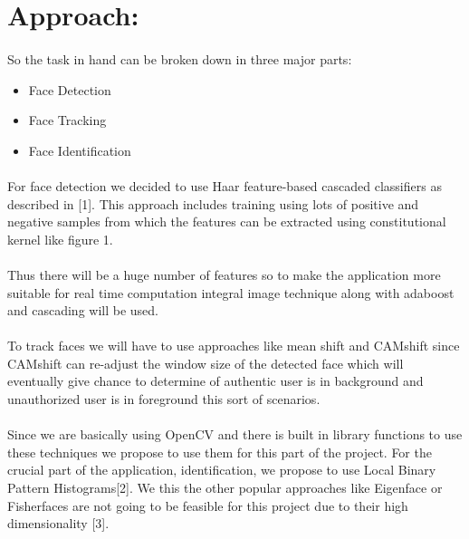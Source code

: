\documentclass[11pt]{article}
\begin{document}
\section*{Approach:}
\paragraph*{} So the task in hand can be broken down in three major parts:
\begin{itemize}
	\item Face Detection
	\item Face Tracking
	\item Face Identification
\end{itemize}

\paragraph*{} For face detection we decided to use Haar feature-based cascaded classifiers as described in [1]. This approach includes training using lots of positive and negative samples from which the features can be extracted using constitutional kernel like figure 1. 

\paragraph*{} Thus there will be a huge number of features so to make the application more suitable for real time computation integral image technique along with adaboost and cascading will be used. 

\paragraph*{} To track faces we will have to use approaches like mean shift and CAMshift since CAMshift can re-adjust the window size of the detected face which will eventually give chance to determine of authentic user is in background and unauthorized user is in foreground this sort of scenarios. 

\paragraph{} Since we are basically using OpenCV and there is built in library functions to use these techniques we propose to use them for this part of the project. For the crucial part of the application, identification, we propose to use Local Binary Pattern Histograms[2]. We this the other popular approaches like Eigenface or Fisherfaces are not going to be feasible for this project due to their high dimensionality [3].
\end{document}
